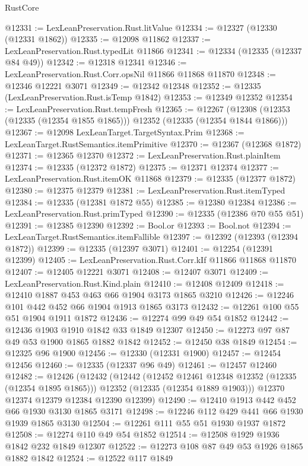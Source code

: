 \begin{lexlean}{RustCore}
\begin{coremodule}
@12331 := LexLeanPreservation.Rust.litValue
@12334 := @12327 (@12330 (@12331 @1862))
@12335 := @12098 @11862
@12337 := LexLeanPreservation.Rust.typedLit @11866
@12341 := @12334 (@12335 (@12337 @84 @49))
@12342 := @12318 @12341
@12346 := LexLeanPreservation.Rust.Corr.opsNil @11866 @11868 @11870
@12348 := @12346 @12221 @3071
@12349 := @12342 @12348
@12352 := @12335 (LexLeanPreservation.Rust.isTemp @1842)
@12353 := @12349 @12352
@12354 := LexLeanPreservation.Rust.tempFresh
@12365 := @12267
    (@12308 (@12353 (@12335 (@12354 @1855 @1865))) @12352 (@12335 (@12354 @1844 @1866)))
@12367 := @12098 LexLeanTarget.TargetSyntax.Prim
@12368 := LexLeanTarget.RustSemantics.itemPrimitive
@12370 := @12367 (@12368 @1872)
@12371 := @12365 @12370
@12372 := LexLeanPreservation.Rust.plainItem
@12374 := @12335 (@12372 @1872)
@12375 := @12371 @12374
@12377 := LexLeanPreservation.Rust.itemOK @11868
@12379 := @12335 (@12377 @1872)
@12380 := @12375 @12379
@12381 := LexLeanPreservation.Rust.itemTyped
@12384 := @12335 (@12381 @1872 @55)
@12385 := @12380 @12384
@12386 := LexLeanPreservation.Rust.primTyped
@12390 := @12335 (@12386 @70 @55 @51)
@12391 := @12385 @12390
@12392 := Bool.or
@12393 := Bool.not
@12394 := LexLeanTarget.RustSemantics.itemFallible
@12397 := @12392 (@12393 (@12394 @1872))
@12399 := @12335 (@12397 @3071)
@12401 := @12254 (@12391 @12399)
@12405 := LexLeanPreservation.Rust.Corr.kIf @11866 @11868 @11870
@12407 := @12405 @12221 @3071
@12408 := @12407 @3071
@12409 := LexLeanPreservation.Rust.Kind.plain
@12410 := @12408 @12409
@12418 := @12410 @1887 @453 @463 @66 @1904 @3173 @1865 @3210
@12426 := @12246 @101 @442 @452 @66 @1904 @1913 @1865 @3173
@12432 := @12261 @100 @55 @51 @1904 @1911 @1872
@12436 := @12274 @99 @49 @54 @1852
@12442 := @12436 @1903 @1910 @1842 @33 @1849 @12307
@12450 := @12273 @97 @87 @49 @53 @1900 @1865 @1882 @1842
@12452 := @12450 @38 @1849
@12454 := @12325 @96 @1900
@12456 := @12330 (@12331 @1900)
@12457 := @12454 @12456
@12460 := @12335 (@12337 @96 @49)
@12461 := @12457 @12460
@12482 := @12426
    (@12432
      (@12442
        (@12452 @12461 @12348 @12352 (@12335 (@12354 @1895 @1865)))
        @12352
        (@12335 (@12354 @1889 @1903)))
      @12370
      @12374
      @12379
      @12384
      @12390
      @12399)
@12490 := @12410 @1913 @442 @452 @66 @1930 @3130 @1865 @3171
@12498 := @12246 @112 @429 @441 @66 @1930 @1939 @1865 @3130
@12504 := @12261 @111 @55 @51 @1930 @1937 @1872
@12508 := @12274 @110 @49 @54 @1852
@12514 := @12508 @1929 @1936 @1842 @232 @1849 @12307
@12522 := @12273 @108 @87 @49 @53 @1926 @1865 @1882 @1842
@12524 := @12522 @117 @1849

\end{coremodule}
\end{lexlean}

